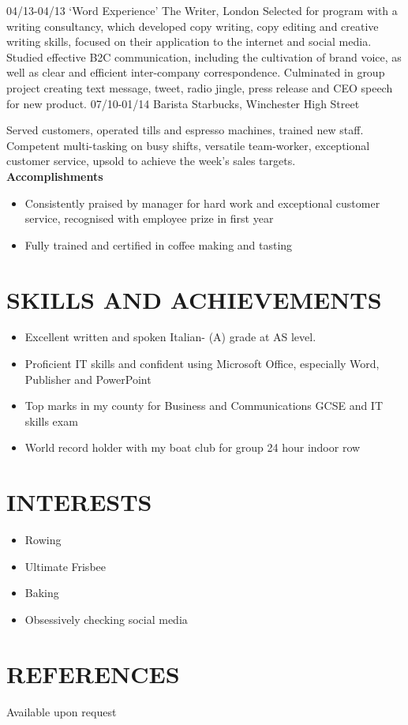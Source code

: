 \documentclass[]{friggeri-cv}
\begin{document}
\begin{entrylist}
  \entry
  {04/13-04/13}
  {‘Word Experience’}
  {The Writer, London}
  {Selected for program with a writing consultancy, which developed copy writing, copy editing and creative writing skills, focused on their application to the internet and social media. Studied effective B2C communication, including the cultivation of brand voice, as well as clear and efficient inter-company correspondence. Culminated in group project creating text message, tweet, radio jingle, press release and CEO speech for new product.}
  \entry
  {07/10-01/14}
  {Barista}
  {Starbucks, Winchester High Street}
  {Served customers, operated tills and espresso machines, trained new staff. Competent multi-tasking on busy shifts, versatile team-worker, exceptional customer service, upsold to achieve the week's sales targets. \\
  	\textbf{Accomplishments}
  	\begin{itemize}
  		\item Consistently praised by manager for hard work and exceptional customer service, recognised with employee prize in first year
  		\item Fully trained and certified in coffee making and tasting
  	\end{itemize}
  }
\end{entrylist}

\section{SKILLS AND ACHIEVEMENTS}

\begin{itemize}
	\item Excellent written and spoken Italian- (A) grade at AS level. 
	\item Proficient IT skills and confident using Microsoft Office, especially Word, Publisher and PowerPoint
	\item Top marks in my county for Business and Communications GCSE and IT skills exam 
	\item World record holder with my boat club for group 24 hour indoor row
\end{itemize}

\section{INTERESTS}

\begin{itemize}
	\item Rowing
	\item Ultimate Frisbee
	\item Baking
	\item Obsessively checking social media
\end{itemize}

\section{REFERENCES}

Available upon request
\end{document}
